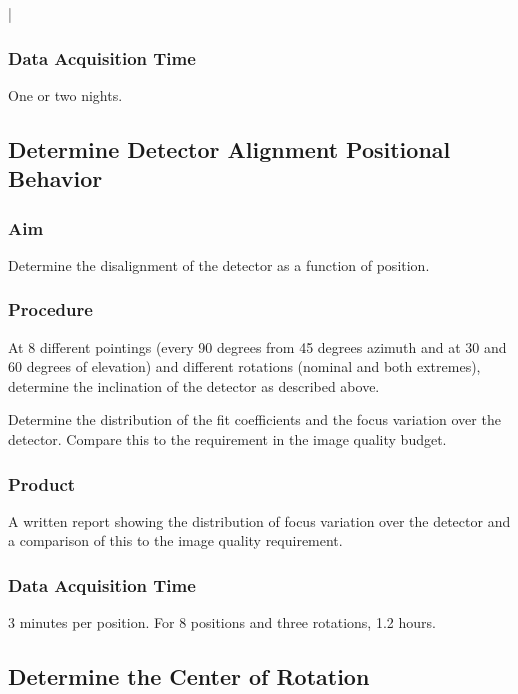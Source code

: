 |\documentclass{article}
\begin{document}
\subsubsection{Data Acquisition Time}

One or two nights.


\subsection{Determine Detector Alignment Positional Behavior}

\subsubsection{Aim}

Determine the disalignment of the detector as a function of position.

\subsubsection{Procedure}

At 8 different pointings (every 90 degrees from 45 degrees azimuth and at 30 and 60 degrees of elevation) and different rotations (nominal and both extremes), determine the inclination of the detector as described above.

Determine the distribution of the fit coefficients and the focus variation over the detector. Compare this to the requirement in the image quality budget.

\subsubsection{Product}

A written report showing the distribution of focus variation over the detector and a comparison of this to the image quality requirement.

\subsubsection{Data Acquisition Time}

3 minutes per position. For 8 positions and three rotations, 1.2 hours.


\subsection{Determine the Center of Rotation}
\end{document}
